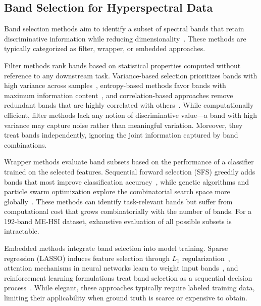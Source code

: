 \subsection{Band Selection for Hyperspectral Data}
\label{sec:related_band}

Band selection methods aim to identify a subset of spectral bands that retain discriminative information while reducing dimensionality~\cite{sun2019hyperspectral}.
These methods are typically categorized as filter, wrapper, or embedded approaches.

Filter methods rank bands based on statistical properties computed without reference to any downstream task.
Variance-based selection prioritizes bands with high variance across samples~\cite{chang2000constrained}, entropy-based methods favor bands with maximum information content~\cite{guo2006band}, and correlation-based approaches remove redundant bands that are highly correlated with others~\cite{martinez2006comparison}.
While computationally efficient, filter methods lack any notion of discriminative value---a band with high variance may capture noise rather than meaningful variation.
Moreover, they treat bands independently, ignoring the joint information captured by band combinations.

Wrapper methods evaluate band subsets based on the performance of a classifier trained on the selected features.
Sequential forward selection (SFS) greedily adds bands that most improve classification accuracy~\cite{pudil1994floating}, while genetic algorithms and particle swarm optimization explore the combinatorial search space more globally~\cite{pal2010feature}.
These methods can identify task-relevant bands but suffer from computational cost that grows combinatorially with the number of bands.
For a 192-band ME-HSI dataset, exhaustive evaluation of all possible subsets is intractable.

Embedded methods integrate band selection into model training.
Sparse regression (LASSO) induces feature selection through $L_1$ regularization~\cite{tibshirani1996regression}, attention mechanisms in neural networks learn to weight input bands~\cite{mou2017deep}, and reinforcement learning formulations treat band selection as a sequential decision process~\cite{roy2020hybridsn}.
While elegant, these approaches typically require labeled training data, limiting their applicability when ground truth is scarce or expensive to obtain.

